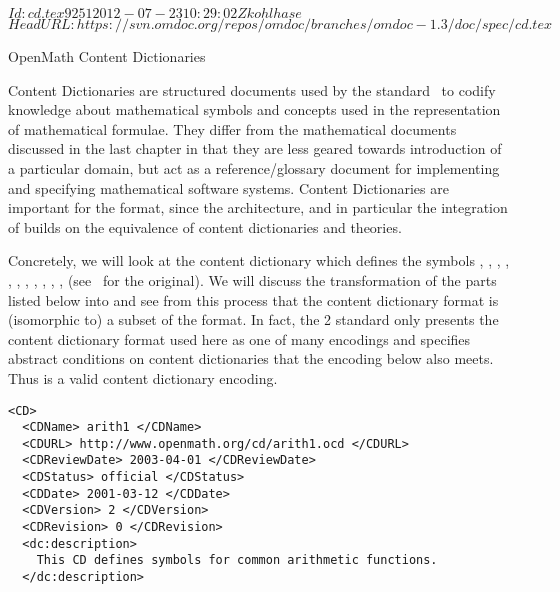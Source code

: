 \svnInfo $Id: cd.tex 9251 2012-07-23 10:29:02Z kohlhase $
\svnKeyword $HeadURL: https://svn.omdoc.org/repos/omdoc/branches/omdoc-1.3/doc/spec/cd.tex $

\begin{tchapter}[id=omcds]{OpenMath Content Dictionaries}

  Content Dictionaries are structured documents used by the {\openmath}
  standard~\cite{BusCapCar:2oms04} to codify knowledge about mathematical symbols and
  concepts used in the representation of mathematical formulae. They differ from the
  mathematical documents discussed in the last chapter in that they are less geared
  towards introduction of a particular domain, but act as a reference/glossary document
  for implementing and specifying mathematical software systems. Content Dictionaries are
  important for the {\omdoc} format, since the {\omdoc} architecture, and in particular
  the integration of {\openmath} builds on the equivalence of {\openmath} content
  dictionaries and {\omdoc} theories.

  Concretely, we will look at the content dictionary {} which defines
  the {\openmath} symbols {}, {}, {},
  {}, {}, {}, {},
  {}, {}, {}, {},
  {} (see~\cite{URL:omcd-core} for the original). We will discuss
  the transformation of the parts listed below into {\omdoc} and see from this process
  that the {\openmath} content dictionary format is (isomorphic to) a subset of the
  {\omdoc} format.  In fact, the {\openmath}2 standard only presents the content
  dictionary format used here as one of many encodings and specifies abstract conditions
  on content dictionaries that the {\omdoc} encoding below also meets. Thus {\omdoc} is a
  valid content dictionary encoding.

\begin{lstlisting}[language=omCD,label=lst:omcd,mathescape,
    caption={Part of the {\openmath} content dictionary {\snippet{arith1.ocd}}}]
<CD>
  <CDName> arith1 </CDName>
  <CDURL> http://www.openmath.org/cd/arith1.ocd </CDURL>
  <CDReviewDate> 2003-04-01 </CDReviewDate>
  <CDStatus> official </CDStatus>
  <CDDate> 2001-03-12 </CDDate>
  <CDVersion> 2 </CDVersion>
  <CDRevision> 0 </CDRevision>
  <dc:description> 
    This CD defines symbols for common arithmetic functions.
  </dc:description>


\end{lstlisting}
\end{tchapter}
